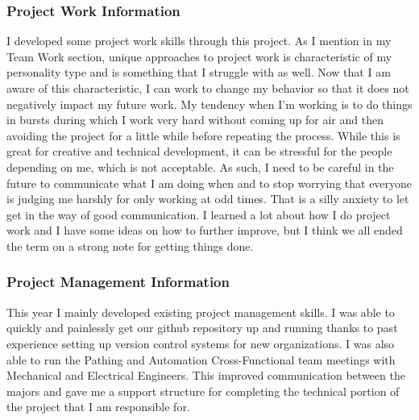 \subsubsection{Project Work Information}
I developed some project work skills through this project. As I mention in my Team Work section, 
unique approaches to project work is characteristic of my personality type and is something that 
I struggle with as well. Now that I am aware of this characteristic, I can work to change my 
behavior so that it does not negatively impact my future work. My tendency when I'm working is 
to do things in bursts during which I work very hard without coming up for air and then avoiding 
the project for a little while before repeating the process. While this is great for creative 
and technical development, it can be stressful for the people depending on me, which is not 
acceptable. As such, I need to be careful in the future to communicate what I am doing when and 
to stop worrying that everyone is judging me harshly for only working at odd times. That is a 
silly anxiety to let get in the way of good communication. I learned a lot about how I do 
project work and I have some ideas on how to further improve, but I think we all ended the term 
on a strong note for getting things done.

\subsubsection{Project Management Information}
This year I mainly developed existing project management skills. I was able to quickly and 
painlessly get our github repository up and running thanks to past experience setting up version 
control systems for new organizations. I was also able to run the Pathing and Automation 
Cross-Functional team meetings with Mechanical and Electrical Engineers. This improved 
communication between the majors and gave me a support structure for completing the technical 
portion of the project that I am responsible for.

